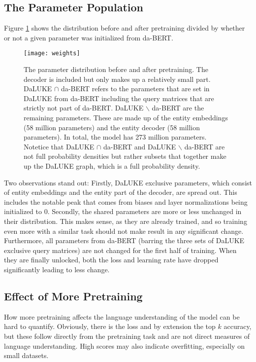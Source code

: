 \documentclass[main.tex]{subfiles}
\begin{document}
\subsection{The Parameter Population}
Figure \ref{fig:weight-dist} shows the distribution before and after pretraining divided by whether or not a given parameter was initialized from da-BERT.
\begin{figure}[H]
    \centering
    \texttt{[image: weights]}
    \caption{
        The parameter distribution before and after pretraining.
        The decoder is included but only makes up a relatively small part.
        DaLUKE $ \cap $ da-BERT refers to the parameters that are set in DaLUKE from da-BERT including the query matrices that are strictly not part of da-BERT.
        DaLUKE $ \backslash $ da-BERT are the remaining parameters.
        These are made up of the entity embeddings (58 million parameters) and the entity decoder (58 million parameters).
        In total, the model has 273 million parameters.
        Notetice that DaLUKE $ \cap $ da-BERT and DaLUKE $ \backslash $ da-BERT are not full probability densities but rather subsets that together make up the DaLUKE graph, which is a full probability density.   
    }
    \label{fig:weight-dist}
\end{figure}\noindent
Two observations stand out:
Firstly, DaLUKE exclusive parameters, which consist of entity embeddings and the entity part of the decoder, are spread out.
This includes the notable peak that comes from biases and layer normalizations being initialized to 0.
Secondly, the shared parameters are more or less unchanged in their distribution.
This makes sense, as they are already trained, and so training even more with a similar task should not make result in any significant change.
Furthermore, all parameters from da-BERT (barring the three sets of DaLUKE exclusive query matrices) are not changed for the first half of training.
When they are finally unlocked, both the loss and learning rate have dropped significantly leading to less change.

\subsection{Effect of More Pretraining}
How more pretraining affects the language understanding of the model can be hard to quantify.
Obviously, there is the loss and by extension the top $ k $ accuracy, but these follow directly from the pretraining task and are not direct measures of language understanding.
High scores may also indicate overfitting, especially on small datasets.
\end{document}
